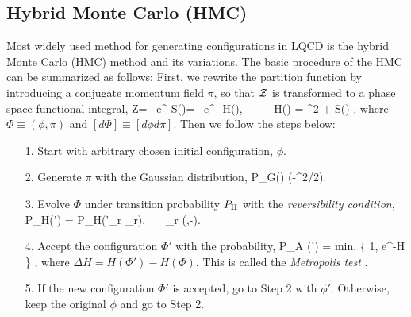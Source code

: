     
    
\subsection{Hybrid Monte Carlo (HMC)}

 Most widely used method   for 
  generating configurations in LQCD 
  is  the hybrid Monte Carlo (HMC) method \cite{Duane:1987de} and its variations.
 The basic procedure of the HMC can be summarized as follows:
 First, we rewrite the partition function by introducing a conjugate momentum field $\pi$,
 so that ${\cal Z}$ is transformed to a phase space functional integral,
\beq
{\cal Z}= \int [d\phi]\ e^{-S(\phi)}= \int [d\Phi] \  e^{- H(\Phi)}, \ \  \ \ \ 
H(\Phi) =  \pi^2 + S(\phi) ,
\eeq
where $\Phi\equiv(\phi,\pi)$ and $[d\Phi]\equiv [d\phi d\pi]$.
Then we follow the steps below:
 \begin{enumerate}
 \item[1.]   Start with arbitrary chosen initial configuration, $\phi$.
 \item[2.]  Generate $\pi$ with the Gaussian distribution, 
 \beq 
 P_{\rm G}(\pi) \propto \exp(-\pi^2/2).
 \eeq
\item[3.]  Evolve $\Phi $ under transition probability $P_{\rm H}$ with the {\it reversibility condition}, 
\beq
\label{eq:reversible}
P_{\rm H}(\Phi \rightarrow \Phi') = P_{\rm H}(\Phi'_r \rightarrow \Phi_r),   \ \ \  \Phi_r \equiv (\phi,-\pi). 
\eeq
\item[4.] Accept the configuration $\Phi'$ with the probability, 
\beq 
\label{eq:MET-test}
P_{\rm A} (\Phi \rightarrow \Phi')  = {\rm min.} \{ 1, e^{-\Delta H} \} ,
\eeq
where  $\Delta H=H(\Phi')- H(\Phi)$.  This is called the {\it Metropolis test}  \cite{Metropolis_1953}.
\item[5.] If the new configuration $\Phi'$ is accepted, go to Step 2 with $\phi'$.
 Otherwise, keep the original $\phi$ and go to Step 2. 
\end{enumerate}

